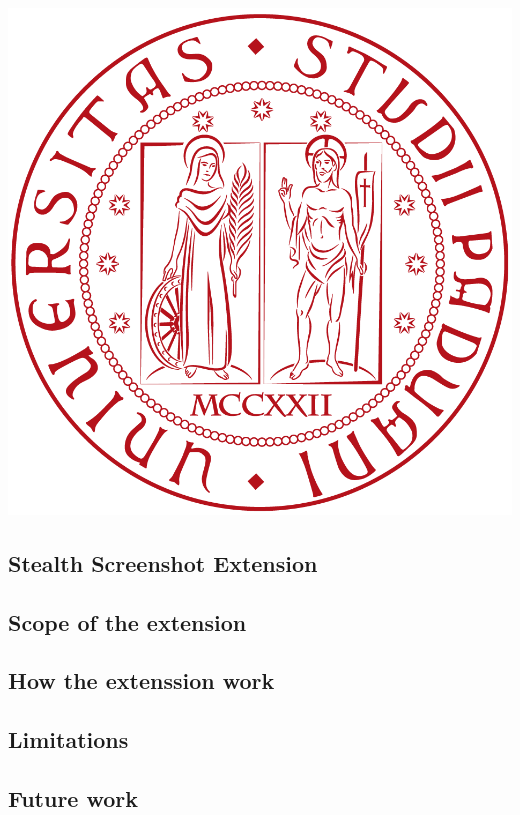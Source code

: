 \documentclass[12pt]{article}
\renewcommand{\today}{\thisdayofweekname\ \the\day\ \monthname\ \the\year}
\begin{document}
\begin{titlepage}
			
			{\large \today}\\[1cm] %
			
			
			\includegraphics[scale=0.20]{Logo.png} %
			
			
			\vfill %
		\end{titlepage}
		
		\newpage

\begin{multicols}{2}
\section{Stealth Screenshot Extension}
\subsection{Scope of the extension}
\subsection{How the extenssion work}
\subsection{Limitations}
\subsection{Future work}
\end{multicols}
 
\end{document}
